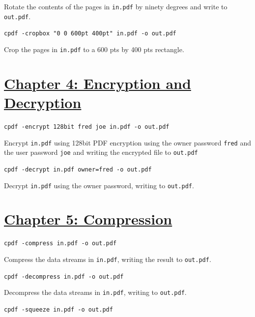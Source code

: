 \documentclass{book}
\begin{document}
\noindent Rotate the contents of the pages in \texttt{in.pdf} by ninety degrees and write to \texttt{out.pdf}.

\begin{framed}\noindent\texttt{cpdf -cropbox "0 0 600pt 400pt" in.pdf -o out.pdf}\end{framed}

\noindent Crop the pages in \texttt{in.pdf} to a 600 pts by 400 pts rectangle.


\section*{\hyperref[chap:4]{Chapter 4: Encryption and Decryption}}

\begin{framed}\noindent\texttt{cpdf -encrypt 128bit fred joe in.pdf -o out.pdf}\end{framed}

\noindent Encrypt \texttt{in.pdf} using 128bit PDF encryption using the owner password \texttt{fred} and the user password \texttt{joe} and writing the encrypted file to \texttt{out.pdf}

\begin{framed}\noindent\texttt{cpdf -decrypt in.pdf owner=fred -o out.pdf}\end{framed}

\noindent Decrypt \texttt{in.pdf} using the owner password, writing to \texttt{out.pdf}.


\section*{\hyperref[chap:5]{Chapter 5: Compression}}

\begin{framed}\noindent\texttt{cpdf -compress in.pdf -o out.pdf}\end{framed}

\noindent Compress the data streams in \texttt{in.pdf}, writing the result to \texttt{out.pdf}.

\begin{framed}\noindent\texttt{cpdf -decompress in.pdf -o out.pdf}\end{framed}

\noindent Decompress the data streams in \texttt{in.pdf}, writing to \texttt{out.pdf}.

\begin{framed}\noindent\texttt{cpdf -squeeze in.pdf -o out.pdf}\end{framed}
\end{document}
